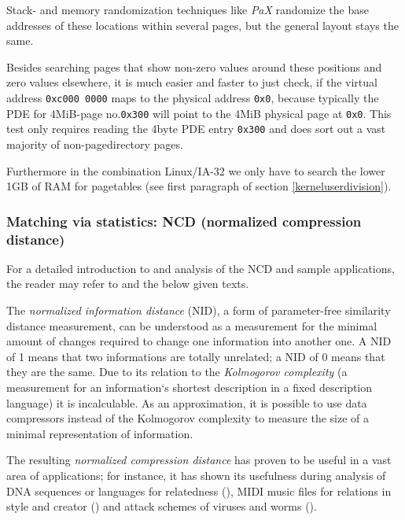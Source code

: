 Stack- and memory randomization techniques like \emph{PaX} randomize the base
addresses of these locations within several pages, but the general layout stays
the same.

Besides searching pages that show non-zero values around these positions and
zero values elsewhere, it is much easier and faster to just check, if the
virtual address \texttt{0xc000~0000} maps to the physical address \texttt{0x0},
because typically the PDE for 4MiB-page no.\@ \texttt{0x300} will point to the
4MiB physical page at \texttt{0x0}. This test only requires reading the 4byte
PDE entry \texttt{0x300} and does sort out a vast majority of non-pagedirectory
pages.

Furthermore in the combination Linux/IA-32 we only have to search the lower 1GB
of RAM for pagetables (see first paragraph of section \ref{kerneluserdivision}).



\subsubsection{Matching via statistics: NCD (normalized compression distance)}

\label{ATTstatistics}

For a detailed introduction to and analysis of the NCD and sample applications,
the reader may refer to \cite{kolmogorov:1997} and the below given texts.

The \emph{normalized information distance} (NID), a form of parameter-free
similarity distance measurement, can be understood as a measurement for the
minimal amount of changes required to change one information into another one.
A NID of 1 means that two informations are totally unrelated; a NID of 0 means
that they are the same. Due to its relation to the \emph{Kolmogorov complexity}
(a measurement for an information`s shortest description in a fixed description
language) it is incalculable. As an approximation, it is possible to use data
compressors instead of the Kolmogorov complexity to measure the size of a
minimal representation of information.

%

The resulting \emph{normalized compression distance} has proven to be useful in
a vast area of applications; for instance, it has shown its usefulness during
analysis of DNA sequences or languages for relatedness
(\cite{clustering_by_compression:2005,similarity_matrix:2004}), MIDI music files
for relations in style and creator (\cite{clustering_by_compression:2005}) and
attack schemes of viruses and worms (\cite{analysing_worms_with_ncd:2006}).

